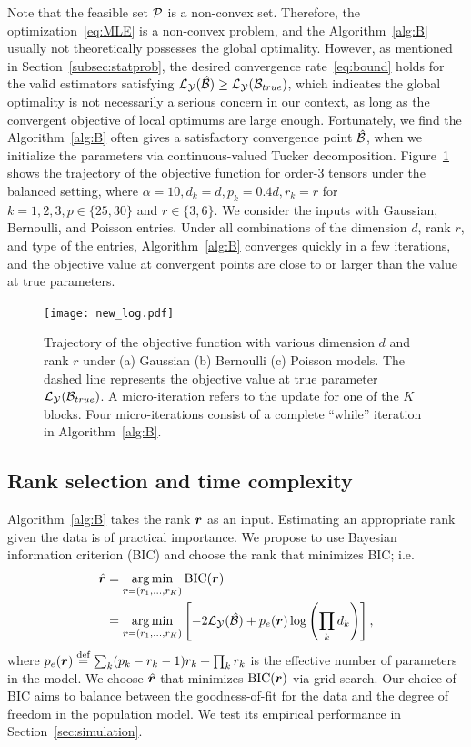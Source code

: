 \documentclass[12pt]{article}
\theoremstyle{plain}
\theoremstyle{definition}
\begin{document}
Note that the feasible set $\mathcal{P}$ is a non-convex set. Therefore, the optimization~\eqref{eq:MLE} is a non-convex problem, and the Algorithm~\ref{alg:B} usually not theoretically possesses the global optimality. However, as mentioned in Section~\ref{subsec:statprob}, the desired convergence rate~\eqref{eq:bound} holds for the valid estimators satisfying $\mathcal{L}_{\mathcal{Y}} (\hat {\mathcal{B}}) \geq \mathcal{L}_{\mathcal{Y}} (\mathcal{B}_{true})$, which indicates the global optimality is not necessarily a serious concern in our context, as long as the convergent objective of local optimums are large enough. Fortunately, we find the  Algorithm~\ref{alg:B}  often gives a satisfactory convergence point $\hat {\mathcal{B}}$, when we initialize the parameters via continuous-valued Tucker decomposition. Figure~\ref{fig:loglike} shows the trajectory of the objective function for order-3 tensors under the balanced setting, where $\alpha = 10, d_k = d, p_k = 0.4d, r_k = r$ for $ k = 1,2,3, p \in \{25,30\}$  and $r \in \{3, 6\}$. We consider the inputs with Gaussian, Bernoulli, and Poisson entries. Under all combinations of the dimension $d$, rank $r$, and type of the entries, Algorithm~\ref{alg:B} converges quickly in a few iterations, and the objective value at convergent points are close to or larger than the value at true parameters.  


\begin{figure}[t]
\centering
\texttt{[image: new\_log.pdf]}
\caption{Trajectory of the objective function with various dimension $d$ and rank $r$ under (a) Gaussian (b) Bernoulli (c) Poisson models. The dashed line represents the objective value at true parameter $\mathcal{L}_{\mathcal{Y}}(\mathcal{B}_{true})$. A micro-iteration refers to the update for one of the $K$ blocks. Four micro-iterations consist of a complete ``while'' iteration in Algorithm~\ref{alg:B}.}\label{fig:loglike}
\end{figure}



\subsection{Rank selection and time complexity}\label{sec:tuning}
Algorithm~\ref{alg:B} takes the rank $\bm{r}$ as an input. Estimating an appropriate rank given the data is of practical importance. We propose to use Bayesian information criterion (BIC) and choose the rank that minimizes BIC; i.e.
\begin{align}\label{eq:BIC}
\hat {\bm{r}}&=\operatorname*{arg\,min}_{\bm{r}=(r_1,\ldots,r_K)} \text{BIC}(\bm{r})\\
&=\operatorname*{arg\,min}_{\bm{r}=(r_1,\ldots,r_K)}\left[-2\mathcal{L}_{\mathcal{Y}}(\hat {\mathcal{B}})+p_e(\bm{r})\log \left(\prod_k d_k\right) \right],
\end{align}
where $p_e(\bm{r})\stackrel{\text{def}}{=}\sum_k (p_k-r_k-1)r_k+\prod_k r_k$ is the effective number of parameters in the model. We choose $\hat {\bm{r}}$ that minimizes $\text{BIC}(\bm{r})$ via grid search. Our choice of BIC aims to balance between the goodness-of-fit for the data and the degree of freedom in the population model. We test its empirical performance in Section~\ref{sec:simulation}.  
\end{document}
